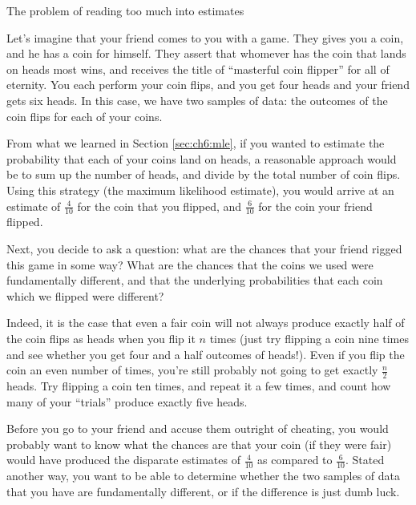 \begin{floatingbox}[h]\caption{The problem of reading too much into estimates}
\label{box:ch7:testing:twosample_coin}
Let's imagine that your friend comes to you with a game. They gives you a coin, and he has a coin for himself. They assert that whomever has the coin that lands on heads most wins, and receives the title of ``masterful coin flipper'' for all of eternity. You each perform your coin flips, and you get four heads and your friend gets six heads. In this case, we have two samples of data: the outcomes of the coin flips for each of your coins. 

From what we learned in Section \ref{sec:ch6:mle}, if you wanted to estimate the probability that each of your coins land on heads, a reasonable approach would be to sum up the number of heads, and divide by the total number of coin flips. Using this strategy (the maximum likelihood estimate), you would arrive at an estimate of $\frac{4}{10}$ for the coin that you flipped, and $\frac{6}{10}$ for the coin your friend flipped.

Next, you decide to ask a question: what are the chances that your friend rigged this game in some way? What are the chances that the coins we used were fundamentally different, and that the underlying probabilities that each coin which we flipped were different? 

Indeed, it is the case that even a fair coin will not always produce exactly half of the coin flips as heads when you flip it $n$ times (just try flipping a coin nine times and see whether you get four and a half outcomes of heads!). Even if you flip the coin an even number of times, you're still probably not going to get exactly $\frac{n}{2}$ heads. Try flipping a coin ten times, and repeat it a few times, and count how many of your ``trials'' produce exactly five heads. 

Before you go to your friend and accuse them outright of cheating, you would probably want to know what the chances are that your coin (if they were fair) would have produced the disparate estimates of $\frac{4}{10}$ as compared to $\frac{6}{10}$. Stated another way, you want to be able to determine whether the two samples of data that you have are fundamentally different, or if the difference is just dumb luck.
\end{floatingbox}

